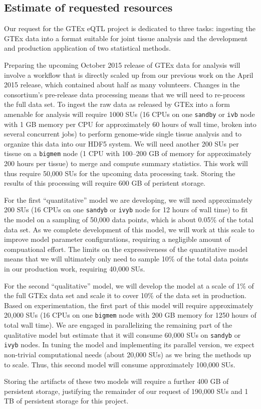 \documentclass[10pt]{article}
\begin{document}
\subsection*{Estimate of requested
resources}\label{gao-estimate-of-requested-resources}

Our request for the GTEx eQTL project is dedicated to three tasks:
ingesting the GTEx data into a format suitable for joint tissue
analysis and the development and production application of two
statistical methods.

Preparing the upcoming October 2015 release of GTEx data for analysis
will involve a workflow that is directly scaled up from our previous
work on the April 2015 release, which contained about half as many
volunteers. Changes in the consortium's pre-release data processing
means that we will need to re-process the full data set. To ingest the
raw data as released by GTEx into a form amenable for analysis will
require 1000 SUs (16 CPUs on one \texttt{sandby} or \texttt{ivb} node
with 1 GB memory per CPU for approximately 60 hours of wall time,
broken into several concurrent jobs) to perform genome-wide single
tissue analysis and to organize this data into our HDF5 system. We
will need another 200 SUs per tissue on a \texttt{bigmem} node (1 CPU
with 100--200 GB of memory for approximately 200 hours per tissue) to
merge and compute summary statistics. This work will thus require
50,000 SUs for the upcoming data processing task. Storing the results
of this processing will require 600 GB of peristent storage.

For the first ``quantitative'' model we are developing, we will need
approximately 200 SUs (16 CPUs on one \texttt{sandyb} or \texttt{ivyb}
node for 12 hours of wall time) to fit the model on a sampling of
50,000 data points, which is about 0.05\% of the total data set. As we
complete development of this model, we will work at this scale to
improve model parameter configurations, requiring a negligible amount
of compuational effort. The limits on the expressiveness of the
quantitative model means that we will ultimately only need to sample
10\% of the total data points in our production work, requiring 40,000
SUs.

For the second ``qualitative'' model, we will develop the model at a
scale of 1\% of the full GTEx data set and scale it to cover 10\% of
the data set in production. Based on experimentation, the first part
of this model will require approximately 20,000 SUs (16 CPUs on one
\texttt{bigmem} node with 200 GB memory for 1250 hours of total wall
time). We are engaged in parallelizing the remaining part of the
qualitative model but estimate that it will consume 60,000 SUs on
\texttt{sandyb} or \texttt{ivyb} nodes. In tuning the model and
implementing its parallel version, we expect non-trivial computational
needs (about 20,000 SUs) as we bring the methods up to scale. Thus,
this second model will consume approximately 100,000 SUs.

Storing the artifacts of these two models will require a further 400
GB of persistent storage, justifying the remainder of our request of
190,000 SUs and 1 TB of persistent storage for this project.

{}

\end{document}
